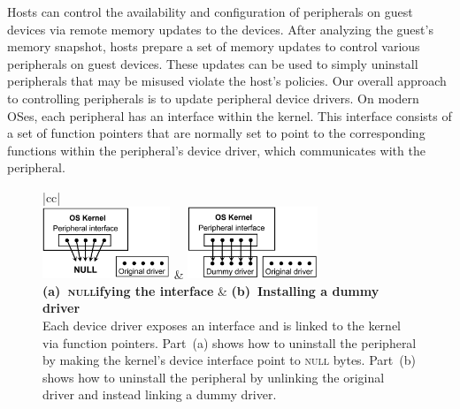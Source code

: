 %
Hosts can control the availability and configuration of peripherals on guest
devices via remote memory updates to the devices. After analyzing the guest's
memory snapshot, hosts prepare a set of memory updates to control various
peripherals on guest devices. These updates can be used to simply uninstall
peripherals that may be misused violate the host's policies. Our overall
approach to controlling peripherals is to update peripheral device drivers. On
modern OSes, each peripheral has an interface within the kernel. This interface
consists of a set of function pointers that are normally set to point to the
corresponding functions within the peripheral's device driver, which
communicates with the peripheral. 

\begin{figure}[t!]
\begin{center}
\footnotesize
\begin{tabular}{|cc|}
\hline
{}\\
\includegraphics[keepaspectratio=true,height=0.85in]{figures/driver-null.png} & 
\includegraphics[keepaspectratio=true,height=0.85in]{figures/driver-dummy.png}\\
\textbf{(a)~\textsc{null}ifying the interface} &
\textbf{(b)~Installing a dummy driver}\\
{\small Each device driver exposes an interface and is linked to the kernel via
function pointers.  Part~(a) shows how to uninstall the peripheral by making
the kernel's device interface point to \textsc{null} bytes.  Part~(b) shows how
to uninstall the peripheral by unlinking the original driver and instead
linking a dummy driver.}\\
\hline
\end{tabular}
\end{center}
\indent\vspace{-0.5cm}
{\label{figure:uninstall}}
\end{figure}

